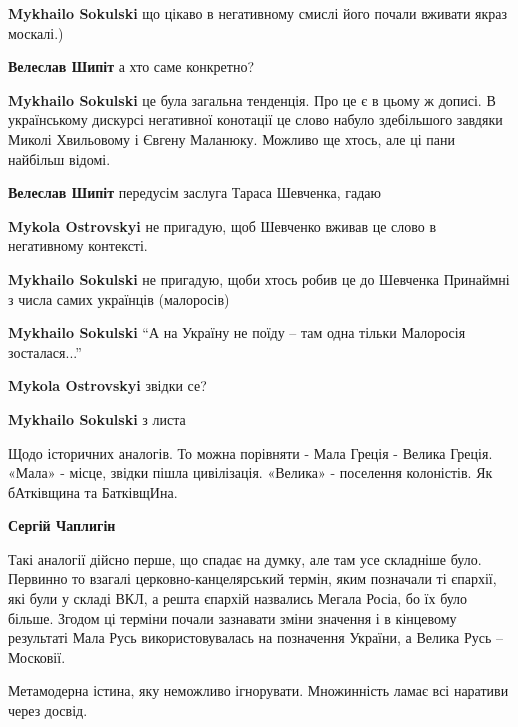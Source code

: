 \begin{itemize}
\begin{itemize} %
\textbf{Mykhailo Sokulski} що цікаво в негативному смислі його почали вживати якраз москалі.)

\textbf{Велеслав Шипіт} а хто саме конкретно?

\textbf{Mykhailo Sokulski} це була загальна тенденція. Про це є в цьому ж дописі.
В українському дискурсі негативної конотації це слово набуло здебільшого завдяки Миколі Хвильовому і Євгену Маланюку. Можливо ще хтось, але ці пани найбільш відомі.

\textbf{Велеслав Шипіт} передусім заслуга Тараса Шевченка, гадаю

\textbf{Mykola Ostrovskyi} не пригадую, щоб Шевченко вживав це слово в негативному контексті.

\textbf{Mykhailo Sokulski} не пригадую, щоби хтось робив це до Шевченка
Принаймні з числа самих українців (малоросів)

\textbf{Mykhailo Sokulski} “А на Україну не поїду – там одна тільки Малоросія зосталася...”

\textbf{Mykola Ostrovskyi} звідки се?

\textbf{Mykhailo Sokulski} з листа

\end{itemize} %


Щодо історичних аналогів. То можна порівняти - Мала Греція - Велика Греція.
«Мала» - місце, звідки пішла цивілізація. «Велика» - поселення колоністів. Як
бАтківщина та БатківщИна.

\begin{itemize} %
\textbf{Сергій Чаплигін} 

Такі аналогії дійсно перше, що спадає на думку, але там усе складніше було.
Первинно то взагалі церковно-канцелярський термін, яким позначали ті єпархії,
які були у складі ВКЛ, а решта єпархій назвались Мегала Росіа, бо їх було
більше. Згодом ці терміни почали зазнавати зміни значення і в кінцевому
результаті Мала Русь використовувалась на позначення України, а Велика Русь --
Московії.

\end{itemize} %

Метамодерна істина, яку неможливо ігнорувати. Множинність ламає всі наративи через досвід.


\end{itemize}
